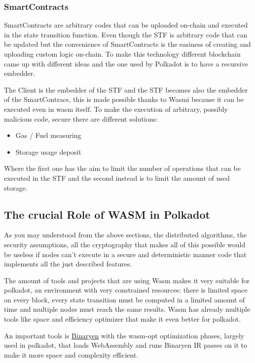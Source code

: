 \documentclass[../main.tex]{subfiles}
\begin{document}
\subsubsection{SmartContracts}

SmartContracts are arbitrary codes that can be uploaded on-chain and executed in the state transition function. Even though the STF is arbitrary code that can be updated but the convenience of SmartContracts is the easiness of creating and uploading custom logic on-chain. To make this technology different blockchain came up with different ideas and the one used by Polkadot is to have a recursive embedder.

The Client is the embedder of the STF and the STF becomes also the embedder of the SmartContracs, this is made possible thanks to Wasmi because it can be executed even in wasm itself. To make the execution of arbitrary, possibly malicious code, secure there are different solutions:

\begin{itemize}
  \item Gas / Fuel measuring
  \item Storage usage deposit
\end{itemize}

Where the first one has the aim to limit the number of operations that can be executed in the STF and the second instead is to limit the amount of used storage.

\subsection{The crucial Role of WASM in Polkadot}

As you may understood from the above sections, the distributed algorithms, the security assumptions, all the cryptography that makes all of this possible would be useless if nodes can't execute in a secure and deterministic manner code that implements all the just described features.

The amount of tools and projects that are using Wasm makes it very suitable for polkadot, an environment with very constrained resources: there is limited space on every block, every state transition must be computed in a limited amount of time and multiple nodes must reach the same results. Wasm has already multiple tools like space and efficiency optimizer that make it even better for polkadot.

An important tools is \href{https://github.com/WebAssembly/binaryen}{Binaryen} with the wasm-opt optimization phases, largely used in polkadot, that loads WebAssembly and runs Binaryen IR passes on it to make it more space and complexity efficient.

\end{document}
